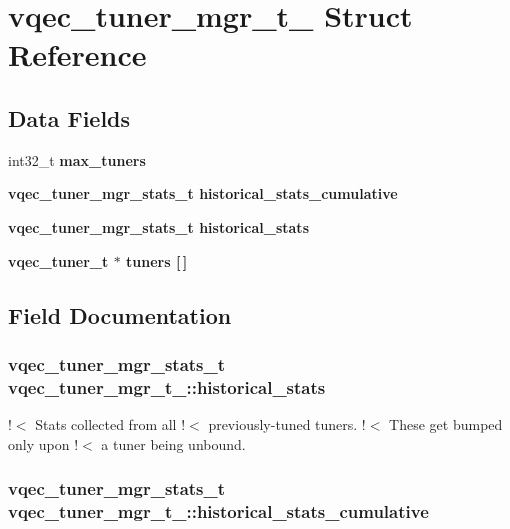 \section{vqec\_\-tuner\_\-mgr\_\-t\_\- Struct Reference}
\label{structvqec__tuner__mgr__t__}
\subsection*{Data Fields}
\begin{CompactItemize}
\item 
int32\_\-t \bf{max\_\-tuners}
\item 
\bf{vqec\_\-tuner\_\-mgr\_\-stats\_\-t} \bf{historical\_\-stats\_\-cumulative}
\item 
\bf{vqec\_\-tuner\_\-mgr\_\-stats\_\-t} \bf{historical\_\-stats}
\item 
\bf{vqec\_\-tuner\_\-t} $\ast$ \bf{tuners} [$\,$]
\end{CompactItemize}


\subsection{Field Documentation}
\subsubsection{\setlength{\rightskip}{0pt plus 5cm}\bf{vqec\_\-tuner\_\-mgr\_\-stats\_\-t} \bf{vqec\_\-tuner\_\-mgr\_\-t\_\-::historical\_\-stats}}\label{structvqec__tuner__mgr__t___498c062e51a17f550f89be91550cc194}


!$<$ Stats collected from all !$<$ previously-tuned tuners. !$<$ These get bumped only upon !$<$ a tuner being unbound. 
\subsubsection{\setlength{\rightskip}{0pt plus 5cm}\bf{vqec\_\-tuner\_\-mgr\_\-stats\_\-t} \bf{vqec\_\-tuner\_\-mgr\_\-t\_\-::historical\_\-stats\_\-cumulative}}\label{structvqec__tuner__mgr__t___9d6dae2c0b4fd0e4d3f2fff45c4c6271}


